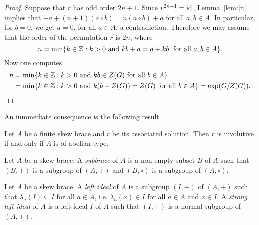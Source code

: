\begin{proof} 
  Suppose that $r$ has odd order $2n+1$. Since $r^{2n+1}=\operatorname{id}$, 
  Lemma~\ref{lem:|r|} implies that $-a+(n+1)(a\circ b)=n(a\circ b)+a$
  for all $a,b\in A$. In particular, for $b=0$, we get $a=0$, 
  for all $a\in A$, a contradiction. 
  Therefore we may assume that the order of the permutation $r$ is
  $2n$, where 
  \[
  n=\min\{k\in\mathbb{Z}: k>0\text{ and }kb+a=a+kb\;\text{ for all }a,b\in A\}.
  \]
  Now one computes
  \begin{align*} 
  n&=\min\{k\in\mathbb{Z}: k>0\text{ and }kb\in Z(G)\text{ for all }b\in A\}\\ 
  &=\min\{k\in\mathbb{Z}: k>0\text{ and }k(b+Z(G)) = Z(G)\text{ for all }b\in A\} =\exp(G/Z(G)).\qedhere
  \end{align*}
\end{proof}

An inmmediate consequence is the following result.

\begin{corollary}
    Let $A$ be a finite skew brace and $r$ be its associated solution. Then 
    $r$ is involutive if and only if $A$ is of abelian type.
    \end{corollary}





\begin{definition}
Let $A$ be a skew brace. A \emph{subbrace} of $A$ is a non-empty 
subset $B$ of $A$ such that $(B,+)$ is a subgroup of $(A,+)$ and $(B,\circ)$ is a subgroup of $(A,\circ)$. 
\end{definition}

\begin{definition}
    Let $A$ be a skew brace. A \emph{left ideal} of $A$ is a subgroup $(I,+)$ of
	$(A,+)$ such that $\lambda_a(I)\subseteq I$ for all $a\in A$, i.e. $\lambda_a(x)\in I$ for all $a\in A$ and $x\in I$. A \emph{strong left ideal} of $A$ 
	is a left ideal $I$ of $A$ such that $(I,+)$ is a normal subgroup of $(A,+)$. 
\end{definition}


